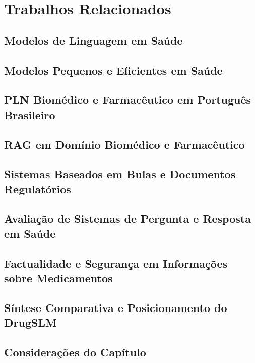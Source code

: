 \chapter{Trabalhos Relacionados}

\section{Modelos de Linguagem em Saúde}

\section{Modelos Pequenos e Eficientes em Saúde}

\section{PLN Biomédico e Farmacêutico em Português Brasileiro}

\section{RAG em Domínio Biomédico e Farmacêutico}

\section{Sistemas Baseados em Bulas e Documentos Regulatórios}

\section{Avaliação de Sistemas de Pergunta e Resposta em Saúde}

\section{Factualidade e Segurança em Informações sobre Medicamentos}

\section{Síntese Comparativa e Posicionamento do DrugSLM}

\section{Considerações do Capítulo}
